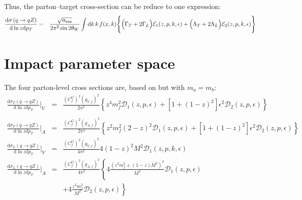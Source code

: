 \documentclass[aps,prd,preprint,superscriptaddress,nofootinbib]{revtex4-2}
\renewcommand{\dd}{\mathrm{d}}
\begin{document}
\par 
Thus, the parton--target cross-section can be reduce to one expression:
\begin{eqnarray}
\frac{\dd\sigma\left(q\rightarrow qZ\right)}{\dd\ln z\dd p_T} &=&	
{ \sqrt{\alpha_{\text{em}}} \over 2 \pi^2 \sin 2\theta_W}
\int \dd k\,k\,f(x,k)	
\Bigg\{ \Big( \Gamma_T + 2\Gamma_L \Big)\mathcal{E}_1(z,p,k,\epsilon)
+ \Big( \Lambda_T + 2 \Lambda_L \Big)\mathcal{E}_2(z,p,k,\epsilon)
\Bigg\} \nonumber \\ 
\end{eqnarray}


\section{Impact parameter space}
The four parton-level cross sections are, based on \cite{Bandeira:2024zjl} but with $m_a = m_b$:
\begin{eqnarray}
	\frac{\dd\sigma_{T}\left(q\rightarrow qZ\right)}{\dd\ln z\dd p_T}\Biggr|_{V}&=& \frac{\left(C_{f}^{G}\right)^{2}\left(g_{V,f}\right)^{2}}{2\pi^{2}}\left\{ 
	z^4m_f^2\mathcal{D}_1(z,p,\epsilon)
	+ [1 + (1-z)^2]\epsilon^2 \mathcal{D}_2(z,p,\epsilon)	
	\right\} \nonumber \\
	\\
	\frac{\dd\sigma_{T}\left(q\rightarrow qZ\right)}{ \dd\ln z \dd p_T}\Biggr|_{A} &=& \frac{\left(C_{f}^{G}\right)^{2}\left(g_{A,f}\right)^{2}}{2\pi^{2}}\left\{ 
	z^2m_f^2(2-z)^2\mathcal{D}_1(z,p,\epsilon)
	+ [1 + (1-z)^2]\epsilon^2 \mathcal{D}_2(z,p,\epsilon)
	\right\} 
	\\ 
	\frac{ \dd\sigma_{L}\left(q\rightarrow qZ\right)}{ \dd\ln z \dd p_T}\Biggr|_{V} &=& \frac{\left(C_{f}^{G}\right)^{2}\left(g_{V,f}\right)^{2}}{4\pi^{2}}4\left(1-z\right)^{2}M^{2}\mathcal{D}_{1}(z,p,k,\epsilon)\\\frac{ \dd\sigma_{L}\left(q\rightarrow qZ\right)}{ \dd\ln z \dd p_T}\Biggr|_{A} &=& \frac{\left(C_{f}^{G}\right)^{2}\left(g_{A,f}\right)^{2}}{4\pi^{2}}\left\{ 4\frac{\left(z^{2}m_{f}^{2}+(1-z)M^{2}\right)^{2}}{M^{2}}\mathcal{D}_{1}(z,p,\epsilon)
	\right. \nonumber \\ && \left.
	+4\frac{z^{2}m_{f}^{2}}{M^{2}}\mathcal{D}_{2}(z,p,\epsilon)\right\}
\end{eqnarray}
\end{document}
